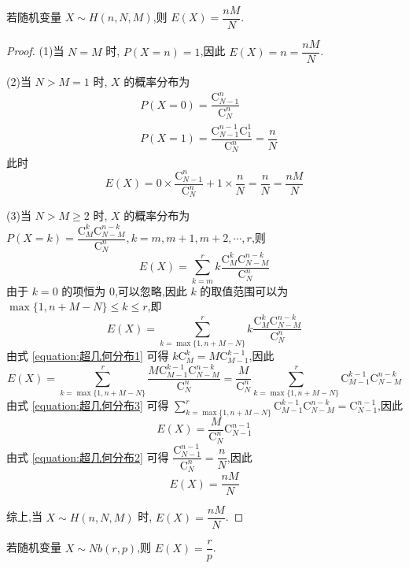 \begin{conclusion}
    \indent 若随机变量 $X \sim H(n,N,M)$,则 $E(X) = \dfrac{nM}{N}$.
\end{conclusion}

\begin{proof}
    (1)当 $N=M$ 时, $P(X=n)=1$,因此 $E(X) = n = \dfrac{nM}{N}$.

    (2)当 $N>M=1$ 时, $X$ 的概率分布为
    $$
    \begin{aligned}
        & P(X=0) = \dfrac{\mathrm{C}_{N-1}^n}{\mathrm{C}_N^n} \\
        & P(X=1) = \dfrac{\mathrm{C}_{N-1}^{n-1} \mathrm{C}_1^1}{\mathrm{C}_N^n} = \dfrac{n}{N}
    \end{aligned}
    $$
    此时
    $$
    E(X) = 0 \times \dfrac{\mathrm{C}_{N-1}^n}{\mathrm{C}_N^n} + 1 \times \dfrac{n}{N} = \dfrac{n}{N} = \dfrac{nM}{N}
    $$

    (3)当 $N>M \geqslant 2$ 时, $X$ 的概率分布为 $P(X=k) = \dfrac{\mathrm{C}_M^k \mathrm{C}_{N-M}^{n-k}}{\mathrm{C}_N^n}, k = m, m+1, m+2, \cdots, r$,则
    $$
    E(X) = \sum_{k=m}^r k \dfrac{\mathrm{C}_M^k \mathrm{C}_{N-M}^{n-k}}{\mathrm{C}_N^n}
    $$
    由于 $k=0$ 的项恒为 $0$,可以忽略,因此 $k$ 的取值范围可以为 $\max\{ 1, n+M-N \} \leqslant k \leqslant r$,即
    $$
    E(X) = \sum_{k=\max\{ 1, n+M-N \}}^r k \dfrac{\mathrm{C}_M^k \mathrm{C}_{N-M}^{n-k}}{\mathrm{C}_N^n}
    $$
    由式 \eqref{equation:超几何分布1} 可得 $k \mathrm{C}_M^k = M \mathrm{C}_{M-1}^{k-1}$,因此
    $$
    E(X) = \sum_{k=\max\{ 1, n+M-N \}}^{r} \dfrac{M \mathrm{C}_{M-1}^{k-1} \mathrm{C}_{N-M}^{n-k}}{\mathrm{C}_N^n} = \dfrac{M}{\mathrm{C}_N^n} \sum_{k=\max\{ 1, n+M-N \}}^{r} \mathrm{C}_{M-1}^{k-1} \mathrm{C}_{N-M}^{n-k}
    $$
    由式 \eqref{equation:超几何分布3} 可得 $\displaystyle\sum_{k=\max\{ 1, n+M-N \}}^{r} \mathrm{C}_{M-1}^{k-1} \mathrm{C}_{N-M}^{n-k} = \mathrm{C}_{N-1}^{n-1}$,因此
    $$
    E(X) = \dfrac{M}{\mathrm{C}_N^n} \mathrm{C}_{N-1}^{n-1}
    $$
    由式 \eqref{equation:超几何分布2} 可得 $\dfrac{\mathrm{C}_{N-1}^{n-1}}{\mathrm{C}_N^n} = \dfrac{n}{N}$,因此
    $$
    E(X) = \dfrac{nM}{N}
    $$

    综上,当 $X \sim H(n,N,M)$ 时, $E(X) = \dfrac{nM}{N}$.
\end{proof}

\begin{conclusion}
    \indent 若随机变量 $X \sim Nb(r,p)$,则 $E(X) = \dfrac{r}{p}$.
\end{conclusion}

